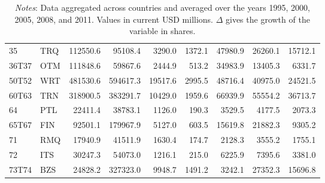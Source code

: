 \documentclass[a4paper,11pt]{article}
\begin{document}
\begin{table}[h]
\begin{tabular}{llrrrrrrr}
    35    & TRQ   & 112550.6 & 95108.4 & 3290.0 & 1372.1 & 47980.9 & 26260.1 & 15712.1 \\
    36T37 & OTM   & 111848.6 & 59867.6 & 2444.9 & 513.2 & 34983.9 & 13405.3 & 6331.7 \\
    50T52 & WRT   & 481530.6 & 594617.3 & 19517.6 & 2995.5 & 48716.4 & 40975.0 & 24521.5 \\
    60T63 & TRN   & 318900.5 & 383291.7 & 10429.0 & 1959.6 & 66939.9 & 55554.2 & 36713.7 \\
    64    & PTL   & 22411.4 & 38783.1 & 1126.0 & 190.3 & 3529.5 & 4177.5 & 2073.3 \\
    65T67 & FIN   & 92501.1 & 179967.9 & 5127.0 & 603.5 & 15619.8 & 21882.3 & 9305.2 \\
    71    & RMQ   & 17940.9 & 41511.9 & 1630.4 & 174.7 & 2128.3 & 3555.2 & 1755.1 \\
    72    & ITS   & 30247.3 & 54073.0 & 1216.1 & 215.0 & 6225.9 & 7395.6 & 3381.0 \\
    73T74 & BZS   & 24828.2 & 327323.0 & 9948.7 & 1491.2 & 3242.1 & 27352.3 & 15696.8 \\
    \bottomrule
   \end{tabular}
         \caption*{\textit{Notes}: Data aggregated across countries and averaged over the years 1995, 2000, 2005, 2008, and 2011. Values in current USD millions. $\Delta$ gives the growth of the variable in shares.}
\end{table}
\end{document}

